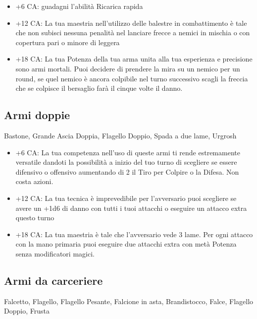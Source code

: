 \documentclass[a4paper,11pt,twoside,openany]{book}
\begin{document}
\begin{itemize}

	\item +6 CA: guadagni l'abilità Ricarica rapida

	\item +12 CA: La tua maestria nell'utilizzo delle balestre in combattimento è tale che non subisci nessuna penalità nel lanciare frecce a nemici in mischia o con copertura pari o minore di leggera

	\item +18 CA: La tua Potenza della tua arma unita alla tua esperienza e precisione sono armi mortali. Puoi decidere di prendere la mira su un nemico per un round, se quel nemico è ancora colpibile nel turno successivo scagli la freccia che se colpisce il bersaglio farà il cinque volte il danno.

\end{itemize}

\subsection{Armi doppie} Bastone, Grande Ascia Doppia, Flagello Doppio, Spada a due lame, Urgrosh

\begin{itemize}
	\item +6 CA: La tua competenza nell'uso di queste armi ti rende estremamente versatile dandoti la possibilità a inizio del tuo turno di scegliere se essere difensivo o offensivo aumentando di 2 il Tiro per Colpire o la Difesa. Non costa azioni.

	\item +12 CA: La tua tecnica è imprevedibile per l'avversario puoi scegliere se avere un +1d6 di danno con tutti i tuoi attacchi o eseguire un attacco extra questo turno

	\item +18 CA: La tua maestria è tale che l'avversario vede 3 lame. Per ogni attacco con la mano primaria puoi eseguire due attacchi extra con metà Potenza senza modificatori magici.
\end{itemize}

\subsection{Armi da carceriere} Falcetto, Flagello, Flagello Pesante, Falcione in asta, Brandistocco, Falce, Flagello Doppio, Frusta
\end{document}
